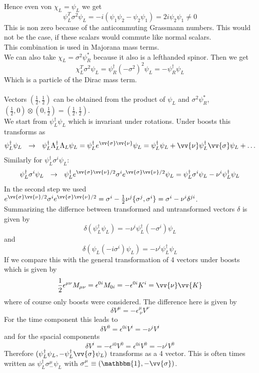 \documentclass{include/thesisclass}
\newcommand{\df}{\rightarrow}
\newcommand{\ehm}{\mathbbm{1}}
\newcommand{\eps}{\epsilon}
\begin{document}
Hence even von $\chi_L = \psi_L$ we get
\[ \psi_L^T \sigma^2 \psi_L = - i( \psi_1 \psi_2 - \psi_2 \psi_1) = 2i \psi_2 \psi_1 \neq 0\]
This is non zero because of the anticommuting Grassmann numbers. This would not be the case, if these scalars would commute like normal scalars.\\
This combination is used in Majorana mass terms.\\
We can also take $\chi_L = \sigma^2\psi_R^*$ because it also is a lefthanded spinor. Then we get
\[\chi_L^T \sigma^2 \psi_L = \psi^\dagger_R(-\sigma^2)^2 \psi_L = - \psi_R^\dagger \psi_L\]
Which is a particle of the Dirac mass term.\\
\\
Vectors $\left(\frac{1}{2},\frac{1}{2}\right)$ can be obtained from the product of $\psi_L$ and $\sigma^2\psi_R^*$, $\left(\frac{1}{2}, 0 \right) \otimes \left(0,\frac{1}{2}\right) = \left(\frac{1}{2},\frac{1}{2}\right)$. \\
We start from $\psi_L^\dagger \psi_L$ which is invariant under rotations. Under boosts this transforms as 
\[ \psi_L^\dagger \psi_L ~~\df~~ \psi_L^\dagger \Lambda_L^\dagger \Lambda_L \psi_L = \psi_L^\dagger e^{\vv{\sigma}\vv{\nu}} \psi_L = \psi_L^\dagger \psi_L + \vv{\nu} \psi_L^\dagger \vv{\sigma} \psi_L + \ldots\]
Similarly for $\psi_L^\dagger \sigma^i \psi_L$:
\[ \psi_L^\dagger \sigma^i \psi_L ~~\df~~ \psi_L^\dagger e^{\vv{\sigma}\vv{\nu}/2} \sigma^i e^{\vv{\sigma}\vv{\nu}/2} \psi_L = \psi_L^\dagger \sigma^i \psi_L - \nu^i \psi_L^\dagger \psi_L\]
In the second step we used $e^{\vv{\sigma}\vv{\nu}/2} \sigma^i e^{\vv{\sigma}\vv{\nu}/2} = \sigma^i - \frac{1}{2} \nu^j \{\sigma^j,\sigma^i\} = \sigma^i - \nu^i \delta^{ji}$.\\
Summarizing the differnce between transformed and untransformed vectors $\delta$ is given by
\[ \delta(\psi_L^\dagger \psi_L) = - \nu^i \psi_L^\dagger (-\sigma^i) \psi_L\]
and
\[ \delta( \psi_L(-i\sigma^i) \psi_L) = -\nu^i \psi^\dagger_L \psi_L\]
If we compare this with the general transformation of 4 vectors under boosts which is given by
\[ \frac{1}{2} \eps^{\mu\nu} M_{\mu\nu} = \eps^{0i} M_{0i} = - \eps^{0i}K^i = \vv{\nu}\vv{K} \]
where of course only boosts were considered. The difference here is given by
\[ \delta V^\mu = - \eps^\mu_{~\nu} V^\nu\]
For the time component this leads to
\[ \delta V^0 = \eps^{0i} V^i = - \nu^i V^i\]
and for the spacial components
\[ \delta V^i = - \eps^{i0} V^0 = \eps^{0i} V^0 =  -\nu^i V^0\]
Therefore $( \psi_L^\dagger \psi_L, - \psi_L^\dagger \vv{\sigma} \psi_L)$ transforms as a 4 vector. This is often times written as $\psi_L ^\dagger \sigma_-^\mu \psi_L$ with $\sigma_-^\mu \equiv (\ehm, - \vv{\sigma})$.\\
\end{document}

